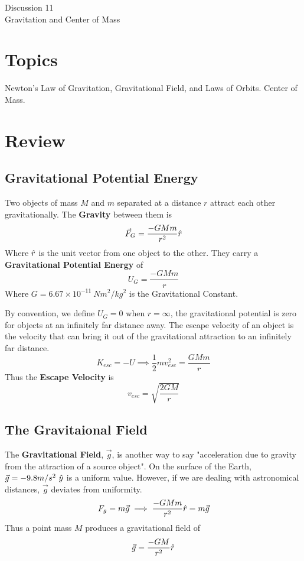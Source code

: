 \documentclass[11pt]{article}
\theoremstyle{gangnamstyle}{\newtheorem{definition}{Definition}[]}
\theoremstyle{gangnamstyle}{\newtheorem{example}{Example}[]}
\theoremstyle{gangnamstyle}{\newtheorem{problem}{Problem}[]}
\begin{document}
\normalfont
\pagestyle{pages}


\begin{center}
\vspace{3in}
{\Large Discussion 11 } \\ [0.05in]
Gravitation and Center of Mass \\ [-0.5in]
\end{center}

\section*{Topics}
Newton's Law of Gravitation, Gravitational Field, and Laws of Orbits. Center of Mass. 

\section{Review}

\subsection{Gravitational Potential Energy}

Two objects of mass $M$ and $m$ separated at a distance $r$ attract each other gravitationally. The \textbf{Gravity} between them is
\[ \Vec{F}_G = \frac{-GMm}{r^2}\Hat{r} \]
Where $\Hat{r}$ is the unit vector from one object to the other. They carry a \textbf{Gravitational Potential Energy} of 
\[ U_G = \frac{-GMm}{r} \]
Where $G = 6.67 \times 10^{-11} \ Nm^2/kg^2$ is the Gravitational Constant. 

By convention, we define $U_G = 0$ when $r = \infty$, the gravitational potential is zero for objects at an infinitely far distance away. The escape velocity of an object is the velocity that can bring it out of the gravitational attraction to an infinitely far distance. 
\[ K_{esc} = -U \implies \frac{1}{2}mv_{esc}^2 = \frac{GMm}{r} \]
Thus the \textbf{Escape Velocity} is
\[ v_{esc} = \sqrt{\frac{2GM}{r}} \]

\subsection{The Gravitaional Field}

The \textbf{Gravitational Field}, $\Vec{g}$, is another way to say "acceleration due to gravity from the attraction of a source object". On the surface of the Earth, $\Vec{g} = -9.8 m/s^2 \ \Hat{y}$ is a uniform value. However, if we are dealing with astronomical distances, $\Vec{g}$ deviates from uniformity. 
\[ F_g = m\Vec{g} \implies \frac{-GMm}{r^2}\Hat{r} = m\Vec{g} \]
Thus a point mass $M$ produces a gravitational field of
\[ \Vec{g} = \frac{-GM}{r^2}\Hat{r} \]
\end{document}
